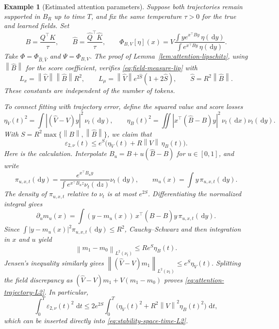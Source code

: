 \documentclass[11pt]{amsart}
\numberwithin{equation}{section}
\theoremstyle{plain}
\newtheorem{example}[theorem]{Example}
\newcommand{\dd}{\,\mathrm{d}}
\newcommand{\abs}[1]{\left\lvert#1\right\rvert}
\newcommand{\norm}[1]{\left\lVert#1\right\rVert}
\begin{document}
\begin{example}[Estimated attention parameters]
\label{ex:estimated-attention-stability}
Suppose both trajectories remain supported in $B_R$ up to time $T$,
and fix the same temperature $\tau>0$ for the true and learned fields.  Set
\[
 B=\frac{Q^\top K}{\tau},\qquad
 \widehat B=\frac{\widehat Q^\top\widehat K}{\tau},\qquad
 \Phi_{B,V}[\eta](x)
 =V\frac{\int y e^{x^\top By}\,\eta(\dd y)}
          {\int e^{x^\top By}\,\eta(\dd y)}.
\]
Take $\Phi=\Phi_{\widehat B,\widehat V}$ and $\Psi=\Phi_{B,V}$.
The proof of Lemma~\ref{lem:attention-lipschitz}, using $\norm{\widehat B}$
for the score coefficient, verifies \eqref{eq:field-measure-lip} with
\[
 L_x=\norm{\widehat V}\norm{\widehat B}R^2,\qquad
 L_\mu=\norm{\widehat V}e^{2\widehat S}(1+2\widehat S),\qquad
 \widehat S=R^2\norm{\widehat B}.
\]
These constants are independent of the number of tokens.

To connect fitting with trajectory error, define the squared value and score
losses
\[
 \eta_V(t)^2=\int\abs{(\widehat V-V)y}^2\,\nu_t(\dd y),\qquad
 \eta_B(t)^2=\iint\abs{x^\top(\widehat B-B)y}^2\,
                         \nu_t(\dd x)\nu_t(\dd y).
\]
With $S=R^2\max\{\norm B,\norm{\widehat B}\}$, we claim that
\begin{equation}\label{eq:attention-trajectory-L2}
 \varepsilon_{2,\nu}(t)
 \leq e^S\bigl(\eta_V(t)+R\norm V\,\eta_B(t)\bigr).
\end{equation}
Here is the calculation.  Interpolate $B_u=B+u(\widehat B-B)$ for $u\in[0,1]$,
and write
\[
 \pi_{u,x,t}(\dd y)
 =\frac{e^{x^\top B_uy}}{\int e^{x^\top B_uz}\nu_t(\dd z)}\nu_t(\dd y),
 \qquad m_u(x)=\int y\,\pi_{u,x,t}(\dd y).
\]
The density of $\pi_{u,x,t}$ relative to $\nu_t$ is at most $e^{2S}$.
Differentiating the normalized integral gives
\[
 \partial_um_u(x)
 =\int (y-m_u(x))\,x^\top(\widehat B-B)y\,\pi_{u,x,t}(\dd y).
\]
Since $\int\abs{y-m_u(x)}^2\pi_{u,x,t}(\dd y)\leq R^2$,
Cauchy--Schwarz and then integration in $x$ and $u$ yield
\[
 \norm{m_1-m_0}_{L^2(\nu_t)}\leq Re^S\eta_B(t).
\]
Jensen's inequality similarly gives
$\norm{(\widehat V-V)m_1}_{L^2(\nu_t)}\leq e^S\eta_V(t)$.
Splitting the field discrepancy as
$(\widehat V-V)m_1+V(m_1-m_0)$ proves
\eqref{eq:attention-trajectory-L2}.  In particular,
\[
 \int_0^T\varepsilon_{2,\nu}(t)^2\,\dd t
 \leq 2e^{2S}\int_0^T
       \bigl(\eta_V(t)^2+R^2\norm V^2\eta_B(t)^2\bigr)\,\dd t,
\]
which can be inserted directly into \eqref{eq:stability-space-time-L2}.
\end{example}
\end{document}
